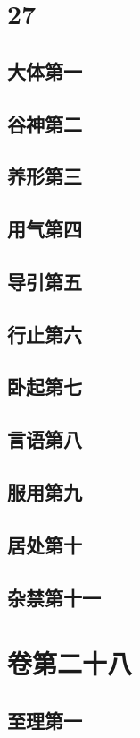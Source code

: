 \documentclass[a4paper,12pt,UTF8,twoside]{ctexbook}
\begin{document}
\part{27}
\chapter{大体第一}
\chapter{谷神第二}
\chapter{养形第三}
\chapter{用气第四}
\chapter{导引第五}
\chapter{行止第六}
\chapter{卧起第七}
\chapter{言语第八}
\chapter{服用第九}
\chapter{居处第十}
\chapter{杂禁第十一}

\part{卷第二十八}

\chapter{至理第一}
\end{document}
